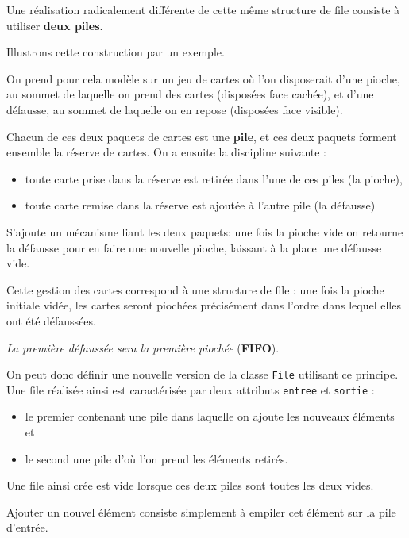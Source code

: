 \documentclass[a4paper,17pt]{extarticle}
\providecommand{\tightlist}{%
      \setlength{\itemsep}{0pt}\setlength{\parskip}{0pt}}
\begin{document}
    Une réalisation radicalement différente de cette même structure de file
consiste à utiliser \textbf{deux piles}.
\begin{exemple}
    Illustrons cette construction par un exemple.

On prend pour cela modèle sur un jeu de cartes où l'on disposerait d'une
pioche, au sommet de laquelle on prend des cartes (disposées face
cachée), et d'une défausse, au sommet de laquelle on en repose
(disposées face visible).

Chacun de ces deux paquets de cartes est une \textbf{pile}, et ces deux
paquets forment ensemble la réserve de cartes. On a ensuite la
discipline suivante :

\begin{itemize}
\tightlist
\item
  toute carte prise dans la réserve est retirée dans l'une de ces piles
  (la pioche),
\item
  toute carte remise dans la réserve est ajoutée à l'autre pile (la
  défausse)
\end{itemize}

S'ajoute un mécanisme liant les deux paquets: une fois la pioche vide on
retourne la défausse pour en faire une nouvelle pioche, laissant à la
place une défausse vide.

Cette gestion des cartes correspond à une structure de file : une fois
la pioche initiale vidée, les cartes seront piochées précisément dans
l'ordre dans lequel elles ont été défaussées.

\emph{La première défaussée sera la première piochée} (\textbf{FIFO}).

        \end{exemple}
    On peut donc définir une nouvelle version de la classe \texttt{File}
utilisant ce principe. Une file réalisée ainsi est caractérisée par deux
attributs \texttt{entree} et \texttt{sortie} :

\begin{itemize}
\tightlist
\item
  le premier contenant une pile dans laquelle on ajoute les nouveaux
  éléments et
\item
  le second une pile d'où l'on prend les éléments retirés.
\end{itemize}

    Une file ainsi crée est vide lorsque ces deux piles sont toutes les deux
vides.

    Ajouter un nouvel élément consiste simplement à empiler cet élément sur
la pile d'entrée.
\end{document}

